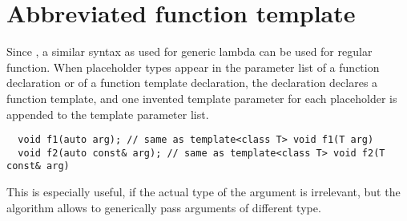 \section{Abbreviated function template}
Since \marginpar{[\cxx{20}]}, a similar syntax as used for generic lambda can be used for regular function. When placeholder types  appear in the
parameter list of a function declaration or of a function template declaration, the declaration declares a function template, and one
invented template parameter for each placeholder is appended to the template parameter list.
%
\begin{verbatim}
  void f1(auto arg); // same as template<class T> void f1(T arg)
  void f2(auto const& arg); // same as template<class T> void f2(T const& arg)
\end{verbatim}
%
This is especially useful, if the actual type of the argument is irrelevant, but the algorithm allows to generically pass arguments of different
type.
